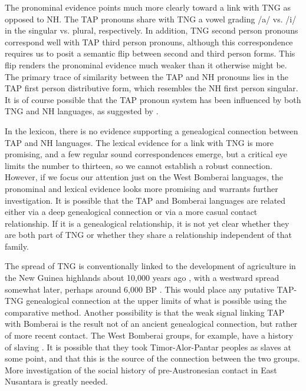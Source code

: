 The pronominal evidence points much more clearly toward a link with TNG as opposed to NH. The TAP pronouns share with TNG a vowel grading /a/ vs. /i/ in the singular vs. plural, respectively. In addition, TNG second person pronouns correspond well with TAP third person pronouns, although this correspondence requires us to posit a semantic flip between second and third person forms. This flip renders the pronominal evidence much weaker than it otherwise might be. The primary trace of similarity between the TAP and NH pronouns lies in the TAP first person distributive form, which resembles the NH first person singular. It is of course possible that the TAP pronoun system has been influenced by both TNG and NH languages, as suggested by \citet{Donohue2008boundpron}.

In the lexicon, there is no evidence supporting a genealogical connection between TAP and NH languages. The lexical evidence for a link with TNG is more promising, and a few regular sound correspondences emerge, but a critical eye limits the number to thirteen, so we cannot establish a robust connection. However, if we focus our attention just on the West Bomberai languages, the pronominal and lexical evidence looks more promising and warrants further investigation. It is possible that the TAP and Bomberai languages are related either via a deep genealogical connection or via a more casual contact relationship. If it is a genealogical relationship, it is not yet clear whether they are both part of TNG or whether they share a relationship independent of that family.

The spread of TNG is conventionally linked to the development of agriculture in the New Guinea highlands about 10,000 years ago \citep{Bellwood2001}, with a westward spread somewhat later, perhaps around 6,000 BP \citep{Pawley1998}. This would place any putative TAP-TNG genealogical connection at the upper limits of what is possible using the comparative method. Another possibility is that the weak signal linking TAP with Bomberai is the result not of an ancient genealogical connection, but rather of more recent contact. The West Bomberai groups, for example, have a history of slaving \citep[109]{KlamerEtAl2008}. It is possible that they took Timor-Alor-Pantar peoples as slaves at some point, and that this is the source of the connection between the two groups. More investigation of the social history of pre-Austronesian contact in East Nusantara is greatly needed.

